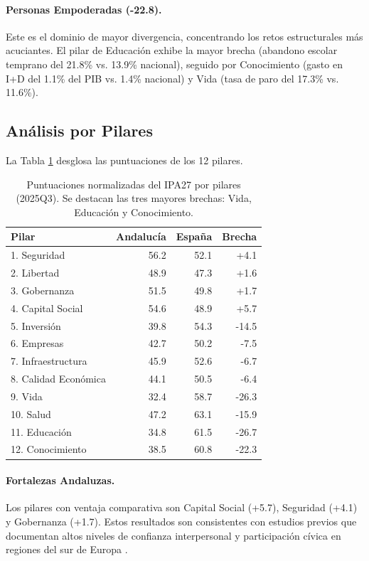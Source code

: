 \documentclass[authoryear,12pt]{elsarticle}
\begin{document}
\paragraph{Personas Empoderadas (-22.8).} Este es el dominio de mayor divergencia, concentrando los retos estructurales más acuciantes. El pilar de Educación exhibe la mayor brecha (abandono escolar temprano del 21.8\% vs. 13.9\% nacional), seguido por Conocimiento (gasto en I+D del 1.1\% del PIB vs. 1.4\% nacional) y Vida (tasa de paro del 17.3\% vs. 11.6\%).

\subsection{Análisis por Pilares}

La Tabla \ref{tab:resultados_pilares} desglosa las puntuaciones de los 12 pilares.

\begin{table}[h!]
\centering
\small
\begin{tabular}{lrrr}
\toprule
\textbf{Pilar} & \textbf{Andalucía} & \textbf{España} & \textbf{Brecha} \\
\midrule
1. Seguridad & 56.2 & 52.1 & +4.1 \\
2. Libertad & 48.9 & 47.3 & +1.6 \\
3. Gobernanza & 51.5 & 49.8 & +1.7 \\
4. Capital Social & 54.6 & 48.9 & +5.7 \\
\midrule
5. Inversión & 39.8 & 54.3 & -14.5 \\
6. Empresas & 42.7 & 50.2 & -7.5 \\
7. Infraestructura & 45.9 & 52.6 & -6.7 \\
8. Calidad Económica & 44.1 & 50.5 & -6.4 \\
\midrule
9. Vida & 32.4 & 58.7 & -26.3 \\
10. Salud & 47.2 & 63.1 & -15.9 \\
11. Educación & 34.8 & 61.5 & -26.7 \\
12. Conocimiento & 38.5 & 60.8 & -22.3 \\
\bottomrule
\end{tabular}
\caption{Puntuaciones normalizadas del IPA27 por pilares (2025Q3). Se destacan las tres mayores brechas: Vida, Educación y Conocimiento.}
\label{tab:resultados_pilares}
\end{table}

\paragraph{Fortalezas Andaluzas.} Los pilares con ventaja comparativa son Capital Social (+5.7), Seguridad (+4.1) y Gobernanza (+1.7). Estos resultados son consistentes con estudios previos que documentan altos niveles de confianza interpersonal y participación cívica en regiones del sur de Europa \citep{putnam1993making}.
\end{document}
